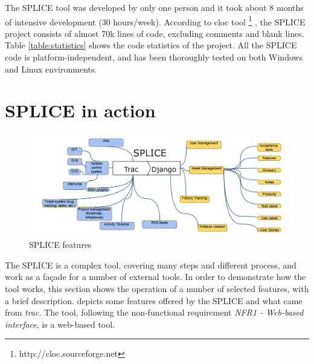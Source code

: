 The \ac{SPLICE} tool was developed by only one person and it took about 8 months of intensive development (30 hours/week). According to cloc tool \footnote{http://cloc.sourceforge.net} , the \ac{SPLICE} project consists of almost 70k lines of code, excluding comments and blank lines. Table \ref{table:statistics} shows the code statistics of the project. All the \ac{SPLICE} code is platform-independent, and has been thoroughly tested on both Windows and Linux environments. 






\section{SPLICE in action}
\label{sc:inaction}

\begin{figure}[htp]
\begin{center}
  \includegraphics[width=16cm]{chapters/proposed_solution/img/splice-features.png}
  \caption[SPLICE features]{SPLICE features}
  \label{fg:splice-features}
\end{center}
\end{figure}

The \ac{SPLICE} is a complex tool, covering many steps and different process, and work as a façade for a number of external tools. In order to demonstrate how the tool works, this section shows the operation of a number of selected features, with a brief description.  depicts some features offered by the \ac{SPLICE} and what came from \textit{trac}. The tool, following the non-functional requirement \textit{NFR1 - Web-based interface}, is a web-based tool.

